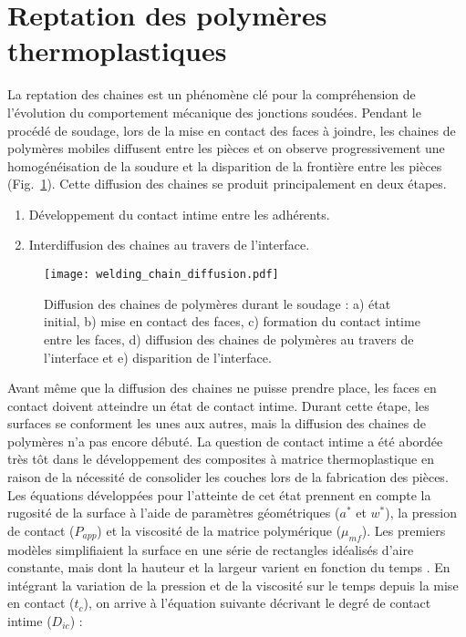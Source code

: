 \section{Reptation des polymères thermoplastiques}

La reptation des chaines est un phénomène clé pour la compréhension de l'évolution du comportement mécanique des jonctions soudées. 
Pendant le procédé de soudage, lors de la mise en contact des faces à joindre, les chaines de polymères mobiles diffusent entre les pièces et on observe progressivement une homogénéisation de la soudure et la disparition de la frontière entre les pièces (Fig.~\ref{fig:polymer_diffusion}). 
Cette diffusion des chaines se produit principalement en deux étapes. 
\begin{enumerate}
	\item Développement du contact intime entre les adhérents.
	\item Interdiffusion des chaines au travers de l'interface.
\end{enumerate}

\begin{figure}[h]
	\centering
	\texttt{[image: welding\_chain\_diffusion.pdf]}
	\caption{Diffusion des chaines de polymères durant le soudage : a) état initial, b) mise en contact des faces, c) formation du contact intime entre les faces, d) diffusion des chaines de polymères au travers de l'interface et e) disparition de l'interface. }
	\label{fig:polymer_diffusion}
\end{figure}

Avant même que la diffusion des chaines ne puisse prendre place, les faces en contact doivent atteindre un état de contact intime. 
Durant cette étape, les surfaces se conforment les unes aux autres, mais la diffusion des chaines de polymères n'a pas encore débuté. 
La question de contact intime a été abordée très tôt dans le développement des composites à matrice thermoplastique en raison de la nécessité de consolider les couches lors de la fabrication des pièces. 
Les équations développées pour l'atteinte de cet état prennent en compte la rugosité de la surface à l'aide de paramètres géométriques ($a^*$ et $w^*$), la pression de contact ($P_{app}$) et la viscosité de la matrice polymérique ($\mu _{mf}$). 
Les premiers modèles simplifiaient la surface en une série de rectangles idéalisés d'aire constante, mais dont la hauteur et la largeur varient en fonction du temps \cite{Lee1987}. 
En intégrant la variation de la pression et de la viscosité sur le temps depuis la mise en contact ($t_c$), on arrive à l'équation suivante décrivant le degré de contact intime ($D_{ic}$) \cite{Mantell1992a} : 


